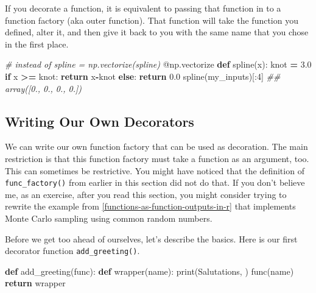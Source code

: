 \documentclass[
  12pt,
  krantz2]{krantz}
\makeatletter
\newenvironment{Shaded}{\begin{snugshade}}{\end{snugshade}}
\newcommand{\AttributeTok}[1]{\textcolor[rgb]{0.61,0.61,0.61}{#1}}
\newcommand{\BuiltInTok}[1]{#1}
\newcommand{\CommentTok}[1]{\textcolor[rgb]{0.37,0.37,0.37}{\textit{#1}}}
\newcommand{\ControlFlowTok}[1]{\textcolor[rgb]{0.27,0.27,0.27}{\textbf{#1}}}
\newcommand{\DecValTok}[1]{\textcolor[rgb]{0.06,0.06,0.06}{#1}}
\newcommand{\FloatTok}[1]{\textcolor[rgb]{0.06,0.06,0.06}{#1}}
\newcommand{\KeywordTok}[1]{\textcolor[rgb]{0.27,0.27,0.27}{\textbf{#1}}}
\newcommand{\NormalTok}[1]{#1}
\newcommand{\OperatorTok}[1]{\textcolor[rgb]{0.43,0.43,0.43}{\textbf{#1}}}
\newcommand{\StringTok}[1]{\textcolor[rgb]{0.5,0.5,0.5}{#1}}
\newenvironment{kframe}{%
\medskip{}
\setlength{\fboxsep}{.8em}
 \def\at@end@of@kframe{}%
 \ifinner\ifhmode%
  \def\at@end@of@kframe{\end{minipage}}%
  \begin{minipage}{\columnwidth}%
 \fi\fi%
 \def\FrameCommand##1{\hskip\@totalleftmargin \hskip-\fboxsep
 \colorbox{shadecolor}{##1}\hskip-\fboxsep
     \hskip-\linewidth \hskip-\@totalleftmargin \hskip\columnwidth}%
 \MakeFramed {\advance\hsize-\width
   \@totalleftmargin\z@ \linewidth\hsize
   \@setminipage}}%
 {\par\unskip\endMakeFramed%
 \at@end@of@kframe}
\renewenvironment{Shaded}{\begin{kframe}}{\end{kframe}}
\makeatother
\begin{document}
If you decorate a function, it is equivalent to passing that function in to a function factory (aka outer function). That function will take the function you defined, alter it, and then give it back to you with the same name that you chose in the first place.

\begin{Shaded}
\begin{Highlighting}[]
\CommentTok{\# instead of spline = np.vectorize(spline) }
\AttributeTok{@np.vectorize}
\KeywordTok{def}\NormalTok{ spline(x):}
\NormalTok{    knot }\OperatorTok{=} \FloatTok{3.0}
    \ControlFlowTok{if}\NormalTok{ x }\OperatorTok{\textgreater{}=}\NormalTok{ knot:}
        \ControlFlowTok{return}\NormalTok{ x}\OperatorTok{{-}}\NormalTok{knot}
    \ControlFlowTok{else}\NormalTok{:}
        \ControlFlowTok{return} \FloatTok{0.0}
\NormalTok{spline(my\_inputs)[:}\DecValTok{4}\NormalTok{]}
\CommentTok{\#\# array([0., 0., 0., 0.])}
\end{Highlighting}
\end{Shaded}

\hypertarget{writing-our-own-decorators}{%
\subsection{Writing Our Own Decorators}\label{writing-our-own-decorators}}

We can write our own function factory that can be used as decoration. The main restriction is that this function factory must take a function as an argument, too. This can sometimes be restrictive. You might have noticed that the definition of \texttt{func\_factory()} from earlier in this section did not do that. If you don't believe me, as an exercise, after you read this section, you might consider trying to rewrite the example from \ref{functions-as-function-outputs-in-r} that implements Monte Carlo sampling using common random numbers.

Before we get too ahead of ourselves, let's describe the basics. Here is our first decorator function \texttt{add\_greeting()}.

\begin{Shaded}
\begin{Highlighting}[]
\KeywordTok{def}\NormalTok{ add\_greeting(func):}
  \KeywordTok{def}\NormalTok{ wrapper(name):}
    \BuiltInTok{print}\NormalTok{(}\StringTok{\textquotesingle{}Salutations, \textquotesingle{}}\NormalTok{)}
\NormalTok{    func(name)}
  \ControlFlowTok{return}\NormalTok{ wrapper}
\end{Highlighting}
\end{Shaded}
\end{document}
